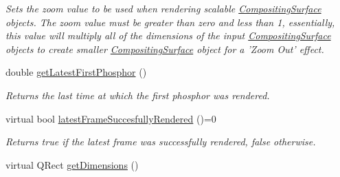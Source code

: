 \begin{DoxyCompactItemize}
\begin{DoxyCompactList}\small\item\em Sets the zoom value to be used when rendering scalable \hyperlink{struct_picto_1_1_compositing_surface}{Compositing\-Surface} objects.  The zoom value must be greater than zero and less than 1, essentially, this value will multiply all of the dimensions of the input \hyperlink{struct_picto_1_1_compositing_surface}{Compositing\-Surface} objects to create smaller \hyperlink{struct_picto_1_1_compositing_surface}{Compositing\-Surface} object for a 'Zoom Out' effect. \end{DoxyCompactList}\item 
\hypertarget{class_picto_1_1_visual_target_a0dd1c52fae74c5ffe146373083c89e96}{double \hyperlink{class_picto_1_1_visual_target_a0dd1c52fae74c5ffe146373083c89e96}{get\-Latest\-First\-Phosphor} ()}\label{class_picto_1_1_visual_target_a0dd1c52fae74c5ffe146373083c89e96}

\begin{DoxyCompactList}\small\item\em Returns the last time at which the first phosphor was rendered. \end{DoxyCompactList}\item 
\hypertarget{class_picto_1_1_visual_target_a62d2be22dc12dc3fec6e125bafce53aa}{virtual bool \hyperlink{class_picto_1_1_visual_target_a62d2be22dc12dc3fec6e125bafce53aa}{latest\-Frame\-Succesfully\-Rendered} ()=0}\label{class_picto_1_1_visual_target_a62d2be22dc12dc3fec6e125bafce53aa}

\begin{DoxyCompactList}\small\item\em Returns true if the latest frame was successfully rendered, false otherwise. \end{DoxyCompactList}\item 
\hypertarget{class_picto_1_1_visual_target_a7e8d0f77979ab56ede4c647f515d2b96}{virtual Q\-Rect \hyperlink{class_picto_1_1_visual_target_a7e8d0f77979ab56ede4c647f515d2b96}{get\-Dimensions} ()}\label{class_picto_1_1_visual_target_a7e8d0f77979ab56ede4c647f515d2b96}


\end{DoxyCompactItemize}
